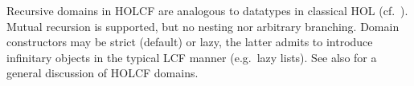 \begin{isabellebody}
\begin{isamarkuptext}
  Recursive domains in HOLCF are analogous to datatypes in classical
  HOL (cf.\ ).  Mutual recursion is
  supported, but no nesting nor arbitrary branching.  Domain
  constructors may be strict (default) or lazy, the latter admits to
  introduce infinitary objects in the typical LCF manner (e.g.\ lazy
  lists).  See also \cite{MuellerNvOS99} for a general discussion of
  HOLCF domains.%
\end{isamarkuptext}%
\isamarkuptrue%
%
\isadelimtheory
%
\endisadelimtheory
%
\isatagtheory
{}\isamarkupfalse%
%
\endisatagtheory
{\isafoldtheory}%
%
\isadelimtheory
%
\endisadelimtheory
\isanewline
\end{isabellebody}%
